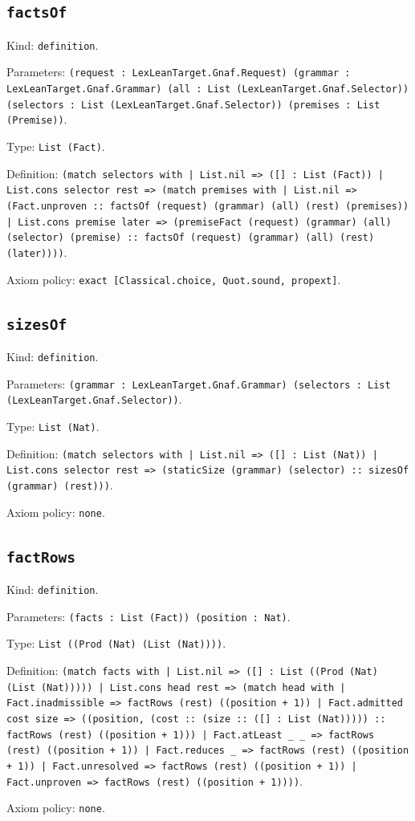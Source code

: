 \documentclass[11pt]{article}
\begin{document}
\subsection*{\texttt{factsOf}}
\noindent Kind: \texttt{definition}.\par
\noindent Parameters: \texttt{(request : LexLeanTarget.Gnaf.Request) (grammar : LexLeanTarget.Gnaf.Grammar) (all : List (LexLeanTarget.Gnaf.Selector)) (selectors : List (LexLeanTarget.Gnaf.Selector)) (premises : List (Premise))}.\par
\noindent Type: \texttt{List (Fact)}.\par
\noindent Definition: \texttt{(match selectors with | List.nil => ([] : List (Fact)) | List.cons selector rest => (match premises with | List.nil => (Fact.unproven :: factsOf (request) (grammar) (all) (rest) (premises)) | List.cons premise later => (premiseFact (request) (grammar) (all) (selector) (premise) :: factsOf (request) (grammar) (all) (rest) (later))))}.\par
\noindent Axiom policy: \texttt{exact [Classical.choice, Quot.sound, propext]}.\par
\subsection*{\texttt{sizesOf}}
\noindent Kind: \texttt{definition}.\par
\noindent Parameters: \texttt{(grammar : LexLeanTarget.Gnaf.Grammar) (selectors : List (LexLeanTarget.Gnaf.Selector))}.\par
\noindent Type: \texttt{List (Nat)}.\par
\noindent Definition: \texttt{(match selectors with | List.nil => ([] : List (Nat)) | List.cons selector rest => (staticSize (grammar) (selector) :: sizesOf (grammar) (rest)))}.\par
\noindent Axiom policy: \texttt{none}.\par
\subsection*{\texttt{factRows}}
\noindent Kind: \texttt{definition}.\par
\noindent Parameters: \texttt{(facts : List (Fact)) (position : Nat)}.\par
\noindent Type: \texttt{List ((Prod (Nat) (List (Nat))))}.\par
\noindent Definition: \texttt{(match facts with | List.nil => ([] : List ((Prod (Nat) (List (Nat))))) | List.cons head rest => (match head with | Fact.inadmissible => factRows (rest) ((position + 1)) | Fact.admitted cost size => ((position, (cost :: (size :: ([] : List (Nat))))) :: factRows (rest) ((position + 1))) | Fact.atLeast \_ \_ => factRows (rest) ((position + 1)) | Fact.reduces \_ => factRows (rest) ((position + 1)) | Fact.unresolved => factRows (rest) ((position + 1)) | Fact.unproven => factRows (rest) ((position + 1))))}.\par
\noindent Axiom policy: \texttt{none}.\par
\end{document}
